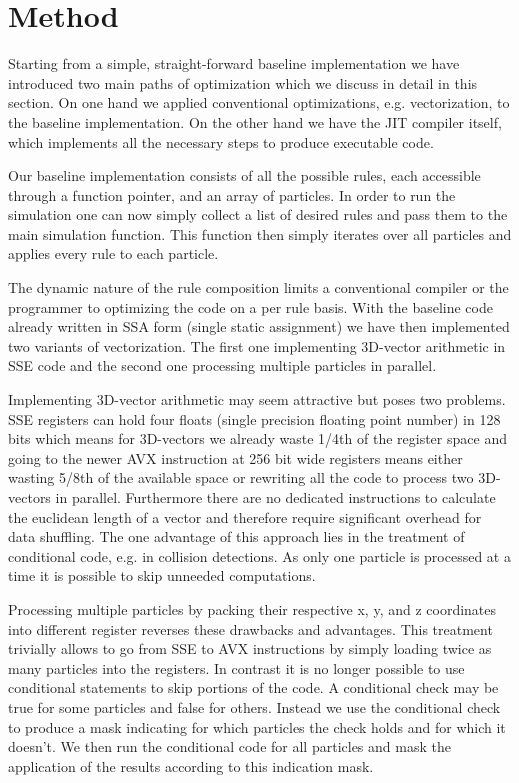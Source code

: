 \section{Method}\label{sec:method}

Starting from a simple, straight-forward baseline implementation we have introduced two main paths of optimization which we discuss in detail in this section. On one hand we applied conventional optimizations, e.g. vectorization, to the baseline implementation. On the other hand we have the JIT compiler itself, which implements all the necessary steps to produce executable code.

Our baseline implementation consists of all the possible rules, each accessible through a function pointer, and an array of particles. In order to run the simulation one can now simply collect a list of desired rules and pass them to the main simulation function. This function then simply iterates over all particles and applies every rule to each particle.

The dynamic nature of the rule composition limits a conventional compiler or the programmer to optimizing the code on a per rule basis. With the baseline code already written in SSA form (single static assignment) we have then implemented two variants of vectorization. The first one implementing 3D-vector arithmetic in SSE code and the second one processing multiple particles in parallel. 

Implementing 3D-vector arithmetic may seem attractive but poses two problems. SSE registers can hold four floats (single precision floating point number) in 128 bits which means for 3D-vectors we already waste 1/4th of the register space and going to the newer AVX instruction at 256 bit wide registers means either wasting 5/8th of the available space or rewriting all the code to process two 3D-vectors in parallel. Furthermore there are no dedicated instructions to calculate the euclidean length of a vector and therefore require significant overhead for data shuffling. The one advantage of this approach lies in the treatment of conditional code, e.g. in collision detections. As only one particle is processed at a time it is possible to skip unneeded computations. 

Processing multiple particles by packing their respective x, y, and z coordinates into different register reverses these drawbacks and advantages. This treatment trivially allows to go from SSE to AVX instructions by simply loading twice as many particles into the registers. In contrast it is no longer possible to use conditional statements to skip portions of the code. A conditional check may be true for some particles and false for others. Instead we use the conditional check to produce a mask indicating for which particles the check holds and for which it doesn't. We then run the conditional code for all particles and mask the application of the results according to this indication mask. 

